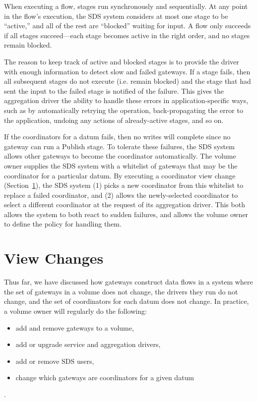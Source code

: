 When executing a flow, stages run synchronously and sequentially.  At any point in the flow's execution, the
SDS system considers at most one stage to be ``active,'' and all of the rest are
``blocked'' waiting for input.  A flow only succeeds if all stages
succeed---each stage becomes active in the right order, and no stages remain
blocked.

The reason to keep track of active and blocked stages is to provide
the driver with enough information to detect slow and failed gateways.
If a stage fails, then all subsequent stages do not execute (i.e. remain
blocked) and the stage that had sent the input to the
failed stage is notified of the failure.  This gives the aggregation driver
the ability to handle these errors in application-specific ways, such as by
automatically retrying the operation, back-propagating the error to the application, 
undoing any actions of already-active stages, and so on.

If the coordinators for a datum fails, then no writes will complete since no
gateway can run a Publish stage.  To
tolerate these failures, the SDS system allows other gateways to
become the coordinator automatically.  The volume owner supplies the SDS system with a
whitelist of gateways that may be the coordinator for a particular datum.
By executing a coordinator view change (Section~\ref{sec:view-changes}), the SDS
system (1) picks a new coordinator from this
whitelist to replace a failed coordinator, and (2) allows the newly-selected coordinator
to select a different coordinator at the request of its aggregation driver.
This both allows the system to both react to sudden failures, and allows the volume
owner to define the policy for handling them.

\section{View Changes}
\label{sec:view-changes}

Thus far, we have discussed how gateways construct data flows in a system
where the set of gateways in a volume does not change, the
drivers they run do not change, and the set of coordinators for each datum does
not change.  In practice, a volume owner will regularly do the following:

\begin{itemize}
   \item add and remove gateways to a volume,
   \item add or upgrade service and aggregation drivers,
   \item add or remove SDS users,
   \item change which gateways are coordinators for a given datum
\end{itemize}.

